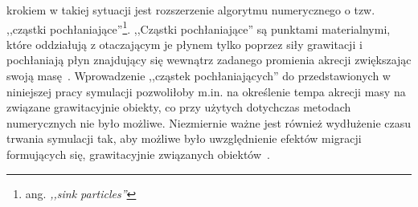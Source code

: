 krokiem w takiej sytuacji jest rozszerzenie algorytmu numerycznego o tzw.
,,cząstki pochłaniające''\footnote{ang. \emph{,,sink particles''}}. ,,Cząstki
pochłaniające'' są punktami materialnymi, które oddziałują z otaczającym je
płynem tylko poprzez siły grawitacji i pochłaniają płyn znajdujący się wewnątrz
zadanego promienia akrecji zwiększając swoją masę~\cite{FBCK10}. Wprowadzenie
,,cząstek pochłaniających'' do przedstawionych w niniejszej pracy symulacji
pozwoliłoby m.in. na określenie tempa akrecji masy na związane grawitacyjnie
obiekty, co przy użytych dotychczas metodach numerycznych nie było możliwe.
Niezmiernie ważne jest również wydłużenie czasu trwania symulacji tak, aby
możliwe było uwzględnienie efektów migracji formujących się, grawitacyjnie
związanych obiektów~\cite{ML14}.



